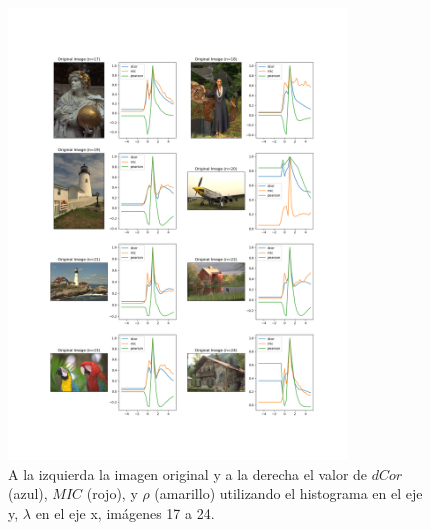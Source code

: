 \begin{figure}
    \centering
    \includegraphics[width=0.8\textwidth]{figuras/hist_comp_3.png}
    \caption{A la izquierda la imagen original y a la derecha el valor de $dCor$ (azul), $MIC$ (rojo), y $\rho$ (amarillo) utilizando el histograma en el eje y, $\lambda$ en el eje x, im\'agenes 17 a 24.}
\end{figure}




